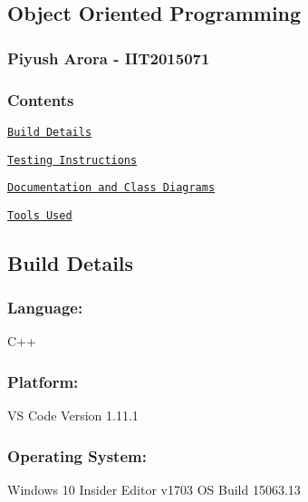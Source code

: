 \subsection*{Object Oriented Programming}

\subsubsection*{Piyush Arora -\/ I\+I\+T2015071}

\subsubsection*{Contents}


\begin{DoxyItemize}
\item \href{#build-details}{\tt Build Details}
\item \href{#testing-instructions}{\tt Testing Instructions}
\item \href{#documentation-and-class-diagrams}{\tt Documentation and Class Diagrams}
\item \href{#tools-used}{\tt Tools Used}
\end{DoxyItemize}

\subsection*{Build Details}

\subsubsection*{Language\+:}


\begin{DoxyCode}
C++
\end{DoxyCode}


\subsubsection*{Platform\+:}


\begin{DoxyCode}
VS Code Version 1.11.1
\end{DoxyCode}


\subsubsection*{Operating System\+:}


\begin{DoxyCode}
Windows 10 Insider Editor v1703 OS Build 15063.13
\end{DoxyCode}


